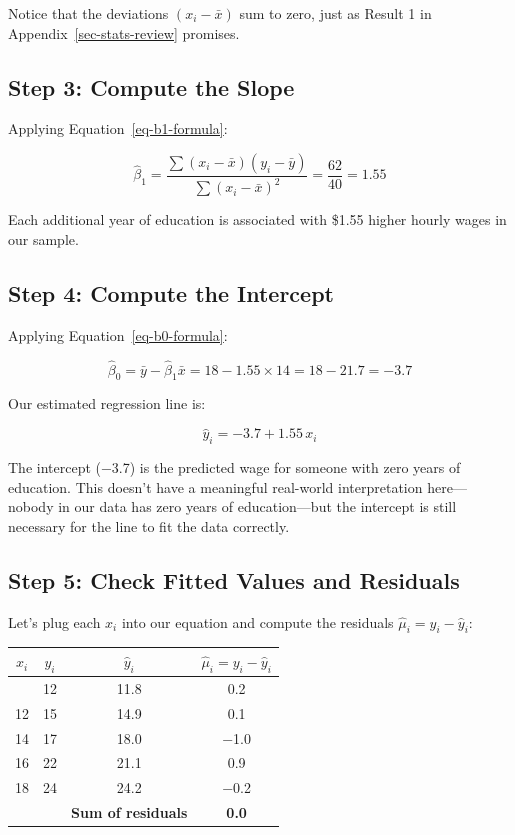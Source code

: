 \documentclass[
  letterpaper,
  DIV=11,
  numbers=noendperiod]{scrreprt}
\newcounter{none} %
\begin{document}
Notice that the deviations \((x_i - \bar{x})\) sum to zero, just as
Result 1 in Appendix~\ref{sec-stats-review} promises.

\subsection{Step 3: Compute the Slope}\label{step-3-compute-the-slope}

Applying Equation~\ref{eq-b1-formula}:

\[
\hat{\beta}_1 = \frac{\sum(x_i - \bar{x})(y_i - \bar{y})}{\sum(x_i - \bar{x})^2} = \frac{62}{40} = 1.55
\]

Each additional year of education is associated with \$1.55 higher
hourly wages in our sample.

\subsection{Step 4: Compute the
Intercept}\label{step-4-compute-the-intercept}

Applying Equation~\ref{eq-b0-formula}:

\[
\hat{\beta}_0 = \bar{y} - \hat{\beta}_1 \bar{x} = 18 - 1.55 \times 14 = 18 - 21.7 = -3.7
\]

Our estimated regression line is:

\[
\hat{y}_i = -3.7 + 1.55 \, x_i
\]

The intercept (−3.7) is the predicted wage for someone with zero years
of education. This doesn't have a meaningful real-world interpretation
here---nobody in our data has zero years of education---but the
intercept is still necessary for the line to fit the data correctly.

\subsection{Step 5: Check Fitted Values and
Residuals}\label{step-5-check-fitted-values-and-residuals}

Let's plug each \(x_i\) into our equation and compute the residuals
\(\hat{\mu}_i = y_i - \hat{y}_i\):

{\def\LTcaptype{none} %
\begin{longtable}[]{@{}cccc@{}}
\toprule\noalign{}
\(x_i\) & \(y_i\) & \(\hat{y}_i\) & \(\hat{\mu}_i = y_i - \hat{y}_i\) \\
\midrule\noalign{}
\endhead
\bottomrule\noalign{}
\endlastfoot
10 & 12 & 11.8 & 0.2 \\
12 & 15 & 14.9 & 0.1 \\
14 & 17 & 18.0 & −1.0 \\
16 & 22 & 21.1 & 0.9 \\
18 & 24 & 24.2 & −0.2 \\
& & \textbf{Sum of residuals} & \textbf{0.0} \\
\end{longtable}
}
\end{document}
